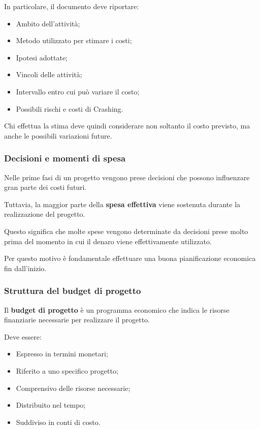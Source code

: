 \medskip

\noindent In particolare, il documento
deve riportare:

\begin{itemize}
    \item Ambito dell'attività;
    \item Metodo utilizzato per stimare i costi;
    \item Ipotesi adottate;
    \item Vincoli delle attività;
    \item Intervallo entro cui può variare il costo;
    \item Possibili rischi e costi di Crashing.
\end{itemize}

\noindent Chi effettua la stima deve quindi
considerare non soltanto il costo previsto,
ma anche le possibili variazioni future.


\subsubsection*{Decisioni e momenti di spesa}

\noindent Nelle prime fasi di un progetto
vengono prese decisioni che possono
influenzare gran parte dei costi futuri.

\medskip

\noindent Tuttavia, la maggior parte della
\textbf{spesa effettiva} viene sostenuta
durante la realizzazione del progetto.

\medskip

\noindent Questo significa che molte spese
vengono determinate da decisioni prese
molto prima del momento in cui
il denaro viene effettivamente utilizzato.

\medskip

\noindent Per questo motivo è fondamentale
effettuare una buona pianificazione
economica fin dall'inizio.


\subsubsection*{Struttura del budget di progetto}

\noindent Il \textbf{budget di progetto}
è un programma economico che indica
le risorse finanziarie necessarie
per realizzare il progetto.

\medskip

\noindent Deve essere:

\begin{itemize}
    \item Espresso in termini monetari;
    \item Riferito a uno specifico progetto;
    \item Comprensivo delle risorse necessarie;
    \item Distribuito nel tempo;
    \item Suddiviso in conti di costo.
\end{itemize}

